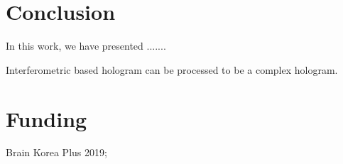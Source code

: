 \documentclass[9pt,twocolumn,twoside]{osajnl}
\begin{document}
\section{Conclusion}

In this work, we have presented .......

Interferometric based hologram can be processed to be a complex hologram.


\section{Funding}

Brain Korea Plus 2019; 




\end{document}
